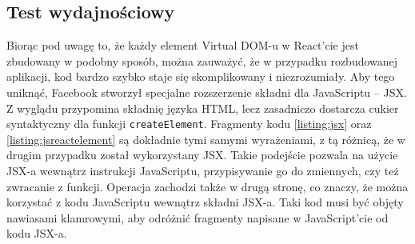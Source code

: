\subsection{Test wydajnościowy}
Biorąc pod uwagę to, że każdy element Virtual DOM-u w React'cie jest zbudowany w podobny sposób, można zauważyć, że w przypadku rozbudowanej aplikacji, kod bardzo szybko staje się skomplikowany i niezrozumiały. Aby tego uniknąć, Facebook stworzył specjalne rozszerzenie składni dla JavaScriptu -- JSX. Z wyglądu przypomina składnię języka HTML, lecz zasadniczo dostarcza cukier syntaktyczny dla funkcji \lstinline[style=JavaScript]{createElement}. Fragmenty kodu \ref{listing:jsx} oraz \ref{listing:jsreactelement} są dokładnie tymi samymi wyrażeniami, z tą różnicą, że w drugim przypadku został wykorzystany JSX. Takie podejście pozwala na użycie JSX-a wewnątrz instrukcji JavaScriptu, przypisywanie go do zmiennych, czy też zwracanie z funkcji. Operacja zachodzi także w drugą stronę, co znaczy, że można korzystać z kodu JavaScriptu wewnątrz składni JSX-a. Taki kod musi być objęty nawiasami klamrowymi, aby odróżnić fragmenty napisane w JavaScript'cie od kodu JSX-a. 

